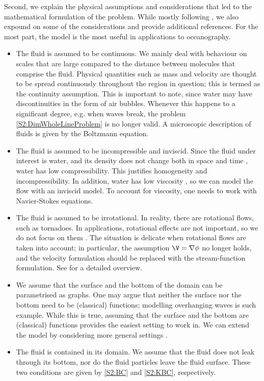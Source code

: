 Second, we explain the physical assumptions and considerations that led to the mathematical formulation of the problem. While mostly following \cite[Chapter 1]{Lannes}, we also expound on some of the considerations and provide additional references. For the most part, the model is the most useful in applications to oceanography.
\begin{itemize}
\item The fluid is assumed to be continuous. We mainly deal with behaviour on scales that are large compared to the distance between molecules that comprise the fluid. Physical quantities such as mass and velocity are thought to be spread continuously throughout the region in question; this is termed as the continuity assumption. This is important to note, since water may have discontinuities in the form of air bubbles. Whenever this happens to a significant degree, e.g. when waves break, the problem \eqref{S2:DimWholeLineProblem} is no longer valid. A microscopic description of fluids is given by the Boltzmann equation. 
\item The fluid is assumed to be incompressible and inviscid. Since the fluid under interest is water, and its density does not change both in space and time \cite{}, water has low compressibility. This justifies homogeneity and incompressibility. In addition, water has low viscosity \cite{}, so we can model the flow with an inviscid model. To account for viscosity, one needs to work with Navier-Stokes equations. 
\item The fluid is assumed to be irrotational. In reality, there are rotational flows, such as tornadoes. In applications, rotational effects are not important, so we do not focus on them \cite{}. The situation is delicate when rotational flows are taken into account; in particular, the assumption $\V = \nabla \phi$ no longer holds, and the velocity formulation should be replaced with the stream-function formulation. See \cite[p.32]{Lannes} for a detailed overview.
\item We assume that the surface and the bottom of the domain can be parametrised as graphs. One may argue that neither the surface nor the bottom need to be (classical) functions; modelling overhanging waves is such example. While this is true, assuming that the surface and the bottom are (classical) functions provides the easiest setting to work in. We can extend the model by considering more general settings \cite{}.
\item The fluid is contained in its domain. We assume that the fluid does not leak through its bottom, nor do the fluid particles leave the fluid surface. These two conditions are given by \eqref{S2:BC} and \eqref{S2:KBC}, respectively.

\end{itemize}
